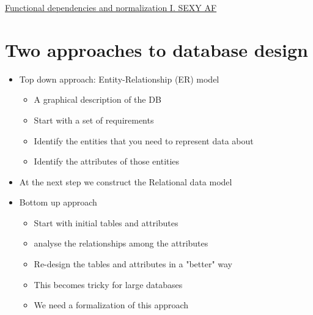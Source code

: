 \documentclass{article}[18pt]
\begin{document}
\begin{center}
\underline{\huge Functional dependencies and normalization I. SEXY AF}
\end{center}
\section{Two approaches to database design}
\begin{itemize}
	\item Top down approach: Entity-Relationship (ER) model
	\begin{itemize}
		\item A graphical description of the DB
		\item Start with a set of requirements
		\item Identify the entities that you need to represent data about
		\item Identify the attributes of those entities
	\end{itemize}
	\item At the next step we construct the Relational data model
	\item Bottom up approach
	\begin{itemize}
		\item Start with initial tables and attributes
		\item analyse the relationships among the attributes
		\item Re-design the tables and attributes in a "better" way
		\item This becomes tricky for large databases
		\item We need a formalization of this approach
	\end{itemize}
\end{itemize}
\end{document}
